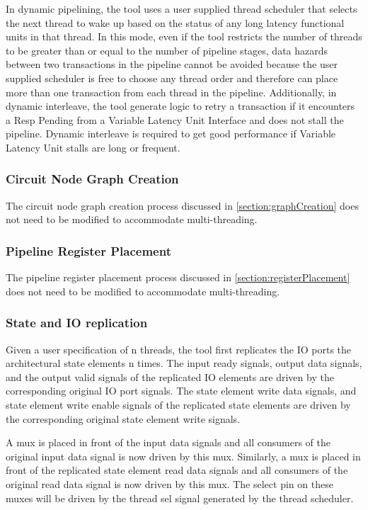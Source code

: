 In dynamic pipelining, the tool uses a user supplied thread scheduler that selects the next thread to wake up based on the status of any long latency functional units in that thread. In this mode, even if the tool restricts the number of threads to be greater than or equal to the number of pipeline stages, data hazards between two transactions in the pipeline cannot be avoided because the user supplied scheduler is free to choose any thread order and therefore can place more than one transaction from each thread in the pipeline. Additionally, in dynamic interleave, the tool generate logic to retry a transaction if it encounters a Resp Pending from a Variable Latency Unit Interface and does not stall the pipeline. Dynamic interleave is required to get good performance if Variable Latency Unit stalls are long or frequent.

\subsubsection{Circuit Node Graph Creation}
The circuit node graph creation process discussed in \ref{section:graphCreation} does not need to be modified to accommodate multi-threading.

\subsubsection{Pipeline Register Placement}
The pipeline register placement process discussed in \ref{section:registerPlacement} does not need to be modified to accommodate multi-threading.

\subsubsection{State and IO replication}
\label{sec:replication}
Given a user specification of n threads, the tool first replicates the IO ports the architectural state elements n times. The input ready signals, output data signals, and the output valid signals of the replicated IO elements are driven by the corresponding original IO port signals. The state element write data signals, and state element write enable signals of the replicated state elements are driven by the corresponding original state element write signals. 

A mux is placed in front of the input data signals and all consumers of the original input data signal is now driven by this mux. Similarly, a mux is placed in front of the replicated state element read data signals and all consumers of the original read data signal is now driven by this mux. The select pin on these muxes will be driven by the thread sel signal generated by the thread scheduler.

